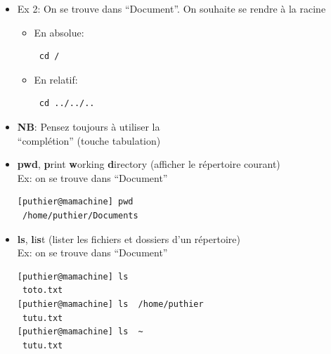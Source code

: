 \documentclass[10pt, xcolor=dvipsnames]{beamer}
\begin{document}
\begin{frame}[fragile]
        \begin{itemize}

            \item  Ex 2: On se trouve dans ``Document''. On souhaite se rendre à la racine\\
        \begin{itemize}
	              \item En absolue: \\
              \begin{verbatim} cd / \end{verbatim}
              \item En relatif: \\
              \begin{verbatim} cd ../../.. \end{verbatim}
        \end{itemize}
            \item \textbf{NB}: Pensez toujours à utiliser la \\``complétion'' (touche tabulation)
        \end{itemize}

\end{frame}



\begin{frame}[fragile]
        \begin{itemize}
  
              \item \textbf{pwd}, \textbf{p}rint \textbf{w}orking \textbf{d}irectory (afficher le répertoire courant)\\
              Ex: on se trouve dans ``Document''\\

          \begin{verbatim}
[puthier@mamachine] pwd
 /home/puthier/Documents
          \end{verbatim}

            \item \textbf{ls}, \textbf{l}i\textbf{s}t (lister les fichiers et dossiers d'un répertoire)\\
            Ex: on se trouve dans ``Document''\\
            \vspace{0.8mm}
          \begin{verbatim}
[puthier@mamachine] ls 
 toto.txt
[puthier@mamachine] ls  /home/puthier
 tutu.txt
[puthier@mamachine] ls  ~
 tutu.txt
          \end{verbatim}
        \end{itemize}

\end{frame}
\end{document}
